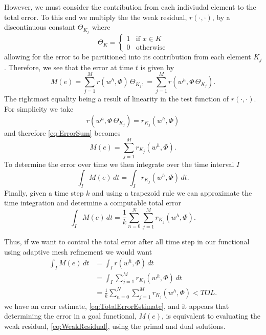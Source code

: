 However, we must consider the contribution from each indiviudal element to
the total error. To this end we multiply the the weak residual, $r(\cdot,
\cdot)$, by a discontinuous constant $\Theta_{K_j}$ where
\begin{equation}
    \Theta_K = \begin{cases}
        1 & \text{if } x \in K \\
        0 & \text{otherwise}
    \end{cases}
    \label{eq:DGTest}
\end{equation}
allowing for the error to be partitioned into its contribution from each element
$K_j$.
Therefore, we see that the error at time $t$ is given by
\begin{equation}
    M(e) = \sum_{j=1}^M r(w^h, \Phi) \, \Theta_{K_j},
         = \sum_{j=1}^M r(w^h, \Phi\, \Theta_{K_j}).
    \label{eq:ErrorSum}
\end{equation}
The rightmost equality being a result of linearity in the test function of
$r(\cdot, \cdot)$.  For simplicity we take
\begin{equation*}
    r(w^h, \Phi\, \Theta_{K_j}) = r_{K_j}(w^h, \Phi)
\end{equation*}
and therefore \eqref{eq:ErrorSum} becomes
\begin{equation}
    M(e) = \sum_{j=1}^M r_{K_j}(w^h, \Phi).
    \label{eq:TotalError}
\end{equation}
To determine the error over time we then integrate over the time interval $I$
\begin{equation*}
    \int_I\! M(e)\, dt = \int_I\! r_{K_j}(w^h, \Phi)\, dt.
\end{equation*}
Finally, given a time step $k$ and using a trapezoid rule we can approximate the
time integration and determine a computable total error
\begin{equation}
    \int_I\! M(e)\, dt = \frac{1}{k} \sum_{n=0}^N \sum_{j=1}^M r_{K_j}(w^h, \Phi).
    \label{eq:TotalErrorEstimate}
\end{equation}

Thus, if we want to control the total error after all time step in our
functional using adaptive mesh refinement we would want
\begin{equation}
    \begin{split}
        \int_I\! M(e)\, dt &= \int_I\! r(w^h, \Phi)\, dt \\
            &= \int_I\! \sum_{j=1}^M r_{K_j}(w^h, \Phi)\, dt \\
            &= \frac{1}{k} \sum_{n=0}^N \sum_{j=1}^M r_{K_j}(w^h, \Phi) < TOL.
    \end{split}
    \label{eq:Tol}
\end{equation}
we have an error estimate, \eqref{eq:TotalErrorEstimate}, and it appears
that determining the error in a goal functional, $M(e)$, is equivalent to
evaluating the weak residual, \eqref{eq:WeakResidual}, using the primal and dual
solutions.

